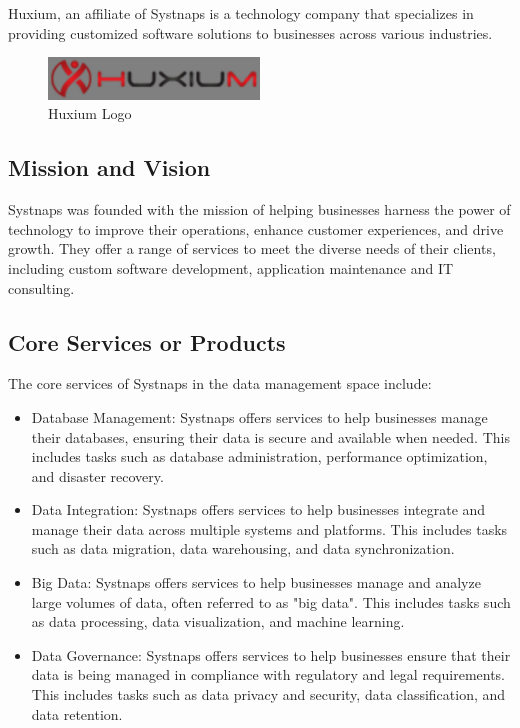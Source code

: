 Huxium, an affiliate of Systnaps is a technology company that specializes in providing customized software solutions to businesses across various industries. 


\begin{figure}[!ht]\centering
\includegraphics[width=0.5\textwidth,angle=00]{assets/fb.png}
\caption{Huxium Logo}
\end{figure}


 \subsection{Mission and Vision }

Systnaps was founded with the mission of helping businesses harness the power of technology to improve their operations, enhance customer experiences, and drive growth. They offer a range of services to meet the diverse needs of their clients, including custom software development, application maintenance and IT consulting. 

\subsection{Core Services or Products }

The core services of Systnaps in the data management space include: 
\begin{itemize}[label={--}]
    \item Database Management: Systnaps offers services to help businesses manage their databases, ensuring their data is secure and available when needed. This includes tasks such as database administration, performance optimization, and disaster recovery. 

\item Data Integration: Systnaps offers services to help businesses integrate and manage their data across multiple systems and platforms. This includes tasks such as data migration, data warehousing, and data synchronization. 

\item Big Data: Systnaps offers services to help businesses manage and analyze large volumes of data, often referred to as "big data". This includes tasks such as data processing, data visualization, and machine learning. 

\item  Data Governance: Systnaps offers services to help businesses ensure that their data is being managed in compliance with regulatory and legal requirements. This includes tasks such as data privacy and security, data classification, and data retention. 

 \end{itemize}


